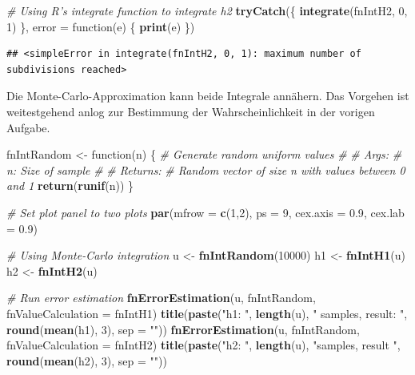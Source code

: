 \documentclass[10pt,]{article}
\newenvironment{Shaded}{\begin{snugshade}}{\end{snugshade}}
\newcommand{\KeywordTok}[1]{\textcolor[rgb]{0.13,0.29,0.53}{\textbf{{#1}}}}
\newcommand{\DataTypeTok}[1]{\textcolor[rgb]{0.13,0.29,0.53}{{#1}}}
\newcommand{\DecValTok}[1]{\textcolor[rgb]{0.00,0.00,0.81}{{#1}}}
\newcommand{\FloatTok}[1]{\textcolor[rgb]{0.00,0.00,0.81}{{#1}}}
\newcommand{\StringTok}[1]{\textcolor[rgb]{0.31,0.60,0.02}{{#1}}}
\newcommand{\CommentTok}[1]{\textcolor[rgb]{0.56,0.35,0.01}{\textit{{#1}}}}
\newcommand{\NormalTok}[1]{{#1}}
\begin{document}
\begin{Shaded}
\begin{Highlighting}[]
\CommentTok{# Using R's integrate function to integrate h2}
\KeywordTok{tryCatch}\NormalTok{(\{}
    \KeywordTok{integrate}\NormalTok{(fnIntH2, }\DecValTok{0}\NormalTok{, }\DecValTok{1}\NormalTok{)}
  \NormalTok{\}, }\DataTypeTok{error =} \NormalTok{function(e) \{}
    \KeywordTok{print}\NormalTok{(e)}
  \NormalTok{\})}
\end{Highlighting}
\end{Shaded}

\begin{verbatim}
## <simpleError in integrate(fnIntH2, 0, 1): maximum number of subdivisions reached>
\end{verbatim}

Die Monte-Carlo-Approximation kann beide Integrale annähern. Das
Vorgehen ist weitestgehend anlog zur Bestimmung der Wahrscheinlichkeit
in der vorigen Aufgabe.

\begin{Shaded}
\begin{Highlighting}[]
\NormalTok{fnIntRandom <-}\StringTok{ }\NormalTok{function(n) \{}
  \CommentTok{# Generate random uniform values}
  \CommentTok{# }
  \CommentTok{# Args:}
  \CommentTok{#   n: Size of sample}
  \CommentTok{#   }
  \CommentTok{# Returns:}
  \CommentTok{#   Random vector of size n with values between 0 and 1}
  \KeywordTok{return}\NormalTok{(}\KeywordTok{runif}\NormalTok{(n))}
\NormalTok{\}}
  
\CommentTok{# Set plot panel to two plots}
\KeywordTok{par}\NormalTok{(}\DataTypeTok{mfrow =} \KeywordTok{c}\NormalTok{(}\DecValTok{1}\NormalTok{,}\DecValTok{2}\NormalTok{), }\DataTypeTok{ps =} \DecValTok{9}\NormalTok{, }\DataTypeTok{cex.axis =} \FloatTok{0.9}\NormalTok{, }\DataTypeTok{cex.lab =} \FloatTok{0.9}\NormalTok{)}

\CommentTok{# Using Monte-Carlo integration}
\NormalTok{u <-}\StringTok{ }\KeywordTok{fnIntRandom}\NormalTok{(}\DecValTok{10000}\NormalTok{)}
\NormalTok{h1 <-}\StringTok{ }\KeywordTok{fnIntH1}\NormalTok{(u)}
\NormalTok{h2 <-}\StringTok{ }\KeywordTok{fnIntH2}\NormalTok{(u)}

\CommentTok{# Run error estimation}
\KeywordTok{fnErrorEstimation}\NormalTok{(u, fnIntRandom, }\DataTypeTok{fnValueCalculation =} \NormalTok{fnIntH1)}
\KeywordTok{title}\NormalTok{(}\KeywordTok{paste}\NormalTok{(}\StringTok{"h1: "}\NormalTok{, }\KeywordTok{length}\NormalTok{(u), }\StringTok{" samples, result: "}\NormalTok{,}
            \KeywordTok{round}\NormalTok{(}\KeywordTok{mean}\NormalTok{(h1), }\DecValTok{3}\NormalTok{), }\DataTypeTok{sep =} \StringTok{""}\NormalTok{))}
\KeywordTok{fnErrorEstimation}\NormalTok{(u, fnIntRandom, }\DataTypeTok{fnValueCalculation =} \NormalTok{fnIntH2)}
\KeywordTok{title}\NormalTok{(}\KeywordTok{paste}\NormalTok{(}\StringTok{"h2: "}\NormalTok{, }\KeywordTok{length}\NormalTok{(u), }\StringTok{"samples, result "}\NormalTok{,}
            \KeywordTok{round}\NormalTok{(}\KeywordTok{mean}\NormalTok{(h2), }\DecValTok{3}\NormalTok{), }\DataTypeTok{sep =} \StringTok{""}\NormalTok{))}
\end{Highlighting}
\end{Shaded}
\end{document}
